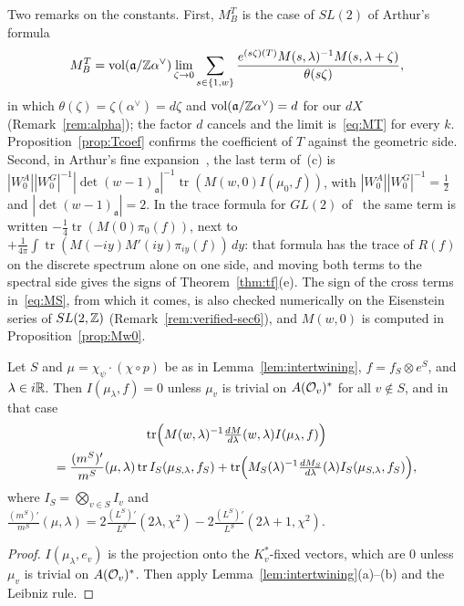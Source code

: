 Two remarks on the constants. First, $M_B^T$ is the case of
$SL(2)$ of Arthur's formula
\[
M_B^T=\operatorname{vol}(\mathfrak a/\mathbb{Z}\alpha^\vee)\lim_{\zeta\to0}
\sum_{s\in\{1,w\}}\frac{e^{(s\zeta)(T)}M(s,\lambda)^{-1}
M(s,\lambda+\zeta)}{\theta(s\zeta)},
\]
in which $\theta(\zeta)=\zeta(\alpha^\vee)=d\zeta$ and
$\operatorname{vol}(\mathfrak a/\mathbb{Z}\alpha^\vee)=d$ for our $dX$
(Remark~\ref{rem:alpha}); the factor $d$ cancels and the limit
is~\eqref{eq:MT} for every $k$. Proposition~\ref{prop:Tcoef} confirms the
coefficient of $T$ against the geometric side. Second, in Arthur's fine
expansion~\cite[Thm.~8.2]{Ar82}, \cite{Li13} the last term of~(c) is
$|W^A_0||W^G_0|^{-1}|\det(w-1)_{\mathfrak a}|^{-1}
\operatorname{tr}(M(w,0)I(\mu_0,f))$, with $|W^A_0||W^G_0|^{-1}=\frac12$
and $|\det(w-1)_{\mathfrak a}|=2$. In the trace formula for $GL(2)$
of~\cite[\S6]{GJ79} the same term is written $-\frac14\operatorname{tr}
(M(0)\pi_0(f))$, next to $+\frac1{4\pi}\int\operatorname{tr}(M(-iy)M'(iy)
\pi_{iy}(f))\,dy$: that formula has the trace of $R(f)$ on the discrete
spectrum alone on one side, and moving both terms to the spectral side
gives the signs of Theorem~\ref{thm:tf}(e). The sign of the cross terms
in~\eqref{eq:MS}, from which it comes, is also checked numerically on
the Eisenstein series of $SL(2,\mathbb{Z})$ (Remark~\ref{rem:verified-sec6}),
and $M(w,0)$ is computed in Proposition~\ref{prop:Mw0}.

\begin{corollary}\label{cor:mprime}
Let $S$ and $\mu=\chi_\psi\cdot(\chi\circ p)$ be as in
Lemma~\ref{lem:intertwining}, $f=f_S\otimes e^S$, and $\lambda\in i\mathbb{R}$.
Then $I(\mu_\lambda,f)=0$ unless $\mu_v$ is trivial on $A(\mathcal{O}_v)^*$ for
all $v\notin S$, and in that case
\begin{multline*}
\operatorname{tr}\Bigl(M(w,\lambda)^{-1}\tfrac{dM}{d\lambda}(w,\lambda)
I(\mu_\lambda,f)\Bigr)\\
=\frac{(m^S)'}{m^S}(\mu,\lambda)\operatorname{tr}
I_S(\mu_{S,\lambda},f_S)+\operatorname{tr}\Bigl(M_S(\lambda)^{-1}
\tfrac{dM_S}{d\lambda}(\lambda)I_S(\mu_{S,\lambda},f_S)\Bigr),
\end{multline*}
where $I_S=\bigotimes_{v\in S}I_v$ and
$\frac{(m^S)'}{m^S}(\mu,\lambda)=2\frac{(L^S)'}{L^S}(2\lambda,\chi^2)
-2\frac{(L^S)'}{L^S}(2\lambda+1,\chi^2)$.
\end{corollary}

\begin{proof}
$I(\mu_\lambda,e_v)$ is the projection onto the $K_v^*$-fixed vectors,
which are $0$ unless $\mu_v$ is trivial on $A(\mathcal{O}_v)^*$. Then apply
Lemma~\ref{lem:intertwining}(a)--(b) and the Leibniz rule.
\end{proof}

